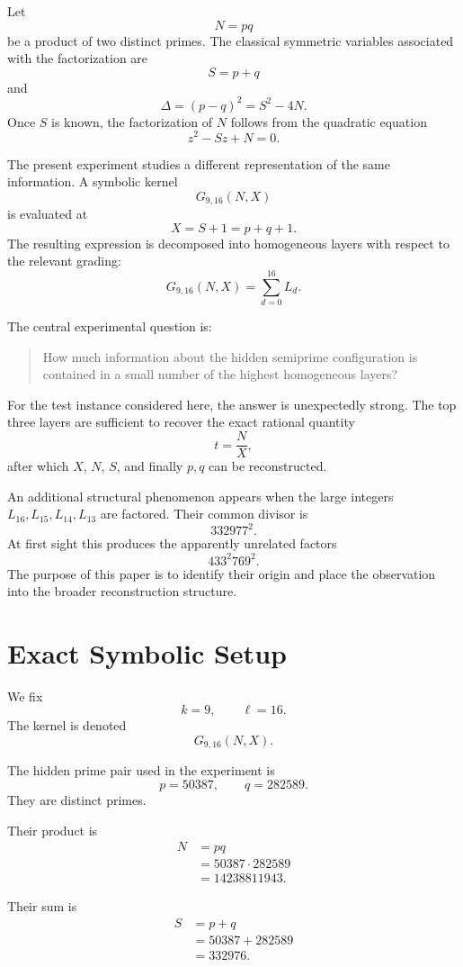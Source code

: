 \documentclass[11pt,a4paper]{article}
\theoremstyle{definition}
\theoremstyle{remark}
\begin{document}
Let
\[
N=pq
\]
be a product of two distinct primes.  The classical symmetric variables
associated with the factorization are
\[
S=p+q
\]
and
\[
\Delta=(p-q)^2=S^2-4N.
\]
Once $S$ is known, the factorization of $N$ follows from the quadratic
equation
\[
z^2-Sz+N=0.
\]

The present experiment studies a different representation of the same
information.  A symbolic kernel
\[
G_{9,16}(N,X)
\]
is evaluated at
\[
X=S+1=p+q+1.
\]
The resulting expression is decomposed into homogeneous layers with
respect to the relevant grading:
\[
G_{9,16}(N,X)
=
\sum_{d=0}^{16}L_d.
\]

The central experimental question is:

\begin{quote}
How much information about the hidden semiprime configuration is contained
in a small number of the highest homogeneous layers?
\end{quote}

For the test instance considered here, the answer is unexpectedly strong.
The top three layers are sufficient to recover the exact rational quantity
\[
t=\frac{N}{X},
\]
after which $X$, $N$, $S$, and finally $p,q$ can be reconstructed.

An additional structural phenomenon appears when the large integers
$L_{16},L_{15},L_{14},L_{13}$ are factored.  Their common divisor is
\[
332977^2.
\]
At first sight this produces the apparently unrelated factors
\[
433^2 769^2.
\]
The purpose of this paper is to identify their origin and place the
observation into the broader reconstruction structure.

\section{Exact Symbolic Setup}

We fix
\[
k=9,
\qquad
\ell=16.
\]
The kernel is denoted
\[
G_{9,16}(N,X).
\]

The hidden prime pair used in the experiment is
\[
p=50387,
\qquad
q=282589.
\]
They are distinct primes.

Their product is
\begin{align}
N
&=pq\\
&=50387\cdot282589\\
&=14238811943.
\end{align}

Their sum is
\begin{align}
S
&=p+q\\
&=50387+282589\\
&=332976.
\end{align}
\end{document}

